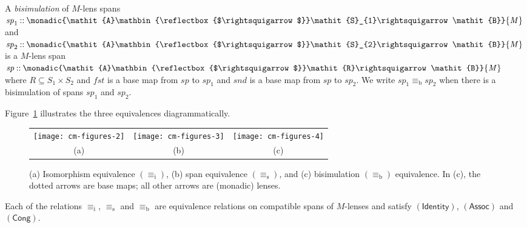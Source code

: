 \documentclass[runningheads]{llncs}
\newcommand{\Conid}[1]{\mathit{#1}}
\newcommand{\Varid}[1]{\mathit{#1}}
\begin{document}
\begin{definition}
  A \emph{bisimulation} of \ensuremath{\Conid{M}}-lens spans \ensuremath{\Varid{sp}_{\mathrm{1}}\mathbin{::}\monadic{\Conid{A}\mathbin{\reflectbox{$\rightsquigarrow$}}\Conid{S}_{1}\rightsquigarrow\Conid{B}}{\Conid{M}}}
  and \ensuremath{\Varid{sp}_{\mathrm{2}}\mathbin{::}\monadic{\Conid{A}\mathbin{\reflectbox{$\rightsquigarrow$}}\Conid{S}_{2}\rightsquigarrow\Conid{B}}{\Conid{M}}} is a \ensuremath{\Conid{M}}-lens span \ensuremath{\Varid{sp}\mathbin{::}\monadic{\Conid{A}\mathbin{\reflectbox{$\rightsquigarrow$}}\Conid{R}\rightsquigarrow\Conid{B}}{\Conid{M}}} where \ensuremath{\Conid{R}\subseteq\Conid{S}_{1} \times \Conid{S}_{2}} and \ensuremath{\Varid{fst}} is a base map from \ensuremath{\Varid{sp}} to
  \ensuremath{\Varid{sp}_{\mathrm{1}}} and \ensuremath{\Varid{snd}} is a base map  from \ensuremath{\Varid{sp}} to \ensuremath{\Varid{sp}_{\mathrm{2}}}.  We write \ensuremath{\Varid{sp}_{\mathrm{1}}\equiv_{\mathrm{b}} \Varid{sp}_{\mathrm{2}}} when there is a bisimulation of spans \ensuremath{\Varid{sp}_{\mathrm{1}}} and
  \ensuremath{\Varid{sp}_{\mathrm{2}}}.
\end{definition}


Figure~\ref{fig:equivalences} illustrates the three equivalences diagrammatically.
\begin{figure}[tb]
  \centering
  \begin{tabular}{ccc}
\texttt{[image: cm-figures-2]}
&
\quad
\texttt{[image: cm-figures-3]}
&
\quad
\texttt{[image: cm-figures-4]}
\\
(a) &\quad
 (b) &\quad
 (c)
  \end{tabular}
  \caption{(a) Isomorphism equivalence \ensuremath{(\equiv_{\mathrm{i}} )}, (b) span
    equivalence \ensuremath{(\equiv_{\mathrm{s}} )}, and (c) bisimulation
    \ensuremath{(\equiv_{\mathrm{b}} )} equivalence.  
In (c), the dotted arrows are base maps; all other
    arrows are (monadic) lenses.}
  \label{fig:equivalences}
\end{figure}
\begin{proposition}
  Each of the relations \ensuremath{\equiv_{\mathrm{i}} }, \ensuremath{\equiv_{\mathrm{s}} } and \ensuremath{\equiv_{\mathrm{b}} } are
  equivalence relations on compatible spans of \ensuremath{\Conid{M}}-lenses and satisfy
  \ensuremath{\mathsf{(Identity)}}, \ensuremath{\mathsf{(Assoc)}} and \ensuremath{\mathsf{(Cong)}}.
\end{proposition}
\end{document}
